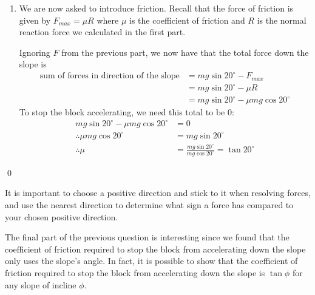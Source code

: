 \begin{solution}
\begin{enumerate}
        Using the previous question, we found that the force down the slope (without $F$) is $mg \sin 20^\circ$. Keeping with the same positive direction as pointing down the slope, since $F$ is pointing up the slope, it is working against the force down the slope, so we need to take it away from the force down the slope to get the total force.

        \[ \text{sum of forces in direction of the slope} = mg \sin 20^\circ - F\]

        To stop the block accelerating, we need this total to be $0$:

        \[ mg \sin 20^\circ - F = 0 \]

        Which we can rearrange to find \[ F = mg \sin 20^\circ \]

        \item 
        We are now asked to introduce friction. Recall that the force of friction is given by $F_{max} = \mu R$ where $\mu$ is the coefficient of friction and $R$ is the normal reaction force we calculated in the first part.

        Ignoring $F$ from the previous part, we now have that the total force down the slope is 
        \begin{align*}
            \text{sum of forces in direction of the slope} &= mg \sin 20^\circ - F_{max} \\
            &= mg \sin 20^\circ - \mu R\\
            &= mg \sin 20^\circ - \mu mg \cos 20^\circ
        \end{align*}
        To stop the block accelerating, we need this total to be $0$:
        \begin{align*}
            mg \sin 20^\circ - \mu mg \cos 20^\circ &= 0 \\
            \therefore \mu mg \cos 20^\circ &= mg \sin 20^\circ \\
            \therefore \mu &= \frac{mg \sin 20^\circ}{mg \cos 20^\circ} = \tan 20^\circ
        \end{align*}
    \end{enumerate}
    \qed
\end{solution}

It is important to choose a positive direction and stick to it when resolving forces, and use the nearest direction to determine what sign a force has compared to your chosen positive direction.

The final part of the previous question is interesting since we found that the coefficient of friction required to stop the block from accelerating down the slope only uses the slope's angle. In fact, it is possible to show that the coefficient of friction required to stop the block from accelerating down the slope is $\tan \phi$ for any slope of incline $\phi$.

